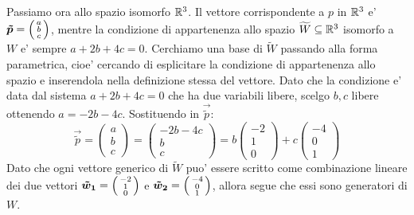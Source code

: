 \begin{solution}
\begin{enumerate}
        Passiamo ora allo spazio isomorfo $\R^3$. Il vettore corrispondente a $p$ in $\R^3$ e' $\vec{\tilde{p}} = \begin{psmallmatrix} a \\ b \\ c \end{psmallmatrix}$, mentre la condizione di appartenenza allo spazio $\widetilde{W} \subseteq \R^3$ isomorfo a $W$ e' sempre $a+2b+4c = 0$. Cerchiamo una base di $\widetilde{W}$ passando alla forma parametrica, cioe' cercando di esplicitare la condizione di appartenenza allo spazio e inserendola nella definizione stessa del vettore.
        Dato che la condizione e' data dal sistema $a+2b+4c = 0$ che ha due variabili libere, scelgo $b, c$ libere ottenendo $a = -2b - 4c$. Sostituendo in $\vec{\tilde{p}}$:\[
            \vec{\tilde p} = \begin{pmatrix} a \\ b \\ c \end{pmatrix} = \begin{pmatrix}
                -2b-4c\\b\\c
            \end{pmatrix} = b\begin{pmatrix} -2 \\ 1 \\ 0 \end{pmatrix} + c\begin{pmatrix} -4 \\ 0 \\ 1 \end{pmatrix}
        \]
        Dato che ogni vettore generico di $\widetilde{W}$ puo' essere scritto come combinazione lineare dei due vettori $\vec{\tilde{w}_1} = \begin{psmallmatrix} -2 \\ 1 \\ 0 \end{psmallmatrix}$ e $\vec{\tilde{w}_2} = \begin{psmallmatrix} -4 \\ 0 \\ 1 \end{psmallmatrix}$, allora segue che essi sono generatori di $W$. 
            

\end{enumerate}
\end{solution}

